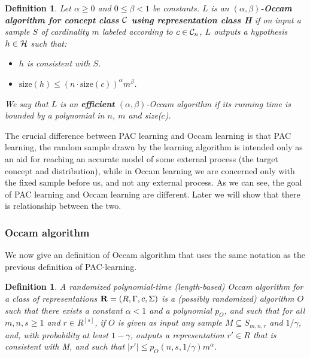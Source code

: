 \documentclass[12pt]{article}
\newtheorem{definition}[theorem]{Definition}
\newcommand{\calc}{{\cal C}}
\newcommand{\calh}{{\cal H}}
\begin{document}
\begin{definition}
  Let $\alpha \ge 0$ and $0 \le \beta < 1$ be constants. $L$ is an {\bf $(\alpha, \beta)$-Occam algorithm for concept class $\calc$ using representation class \calh} if on input a sample $S$ of cardinality $m$ labeled according to $c \in \calc_n$, $L$ outputs a hypothesis $h \in \calh$ such that:

\begin{itemize}
  \item $h$ is consistent with $S$.
  \item $\text {size}(h) \le (n \cdot \text {size}(c))^{\alpha}m^{\beta}$.
\end{itemize}

We say that $L$ is an {\bf efficient} $(\alpha, \beta)$-Occam algorithm if its running time is bounded by a polynomial in $n$, $m$ and size($c$).
\end{definition}

The crucial difference between PAC learning and Occam learning is that PAC learning, the random sample drawn by the learning algorithm is intended only as an aid for reaching an accurate model of some external process (the target concept and distribution), while in Occam learning we are concerned only with the fixed sample before us, and not any external process. As we can see, the goal of PAC learning and Occam learning are different. Later we will show that there is relationship between the two.

\subsubsection{Occam algorithm}

We now give an definition of Occam algorithm that uses the same notation as the previous definition of PAC-learning.

\begin{definition} \label{definition:occ}
A randomized polynomial-time (length-based) Occam algorithm for a class of representations ${\bf R} = (R, \Gamma, c, \Sigma)$ is a (possibly randomized) algorithm $O$ such that there exists a constant $\alpha < 1$ and a polynomial $p_O$, and such that for all $m, n, s \ge 1$ and $r \in R^{[s]}$, if $O$ is given as input any sample $M \subseteq S_{m,n,r}$ and $1 / \gamma$, and, with probability at least $1 - \gamma$, outputs a representation $r' \in R$ that is consistent with M, and such that $|r'| \le p_O(n, s, 1 / \gamma)m^{\alpha}$.
\end{definition}
\end{document}
